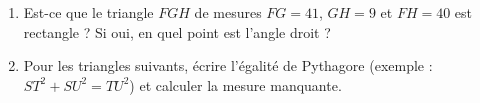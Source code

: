 
\begin{exercice}\label{exosmath-0963}

    \begin{enumerate}
        \item
            Est-ce que le triangle \( FGH\) de mesures \( FG=41\), \( GH=9\) et \( FH=40\) est rectangle ? Si oui, en quel point est l'angle droit ?
        \item
            Pour les triangles suivants, écrire l'égalité de Pythagore (exemple : \( ST^2+SU^2=TU^2\)) et calculer la mesure manquante.
            \begin{center}
   
   \hspace{2cm}
   
            \end{center}
    \end{enumerate}

\end{exercice}
